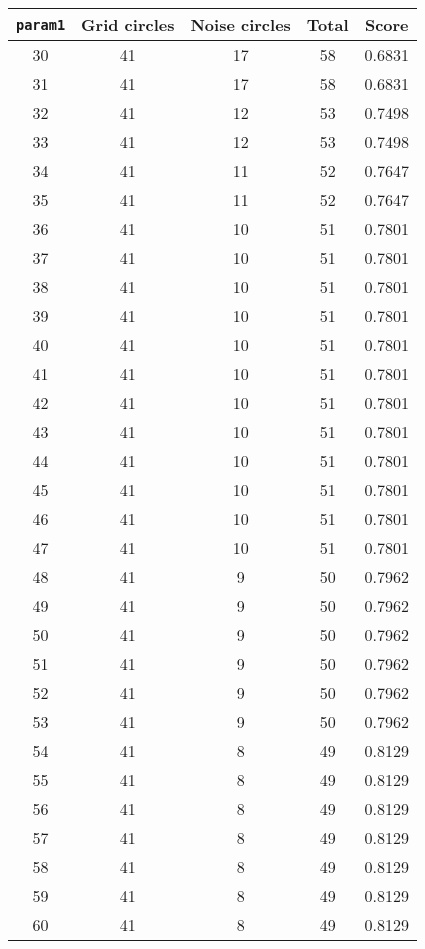 \documentclass[letterpaper, 12pt]{article}
\begin{document}
\begin{longtable}{|c|c|c|c|c|}
\hline
\textbf{\texttt{param1}} & \textbf{Grid circles} & \textbf{Noise circles} & \textbf{Total} & \textbf{Score} \\
\hline
30 & 41 & 17 & 58 & 0.6831 \\
\hline
31 & 41 & 17 & 58 & 0.6831 \\
\hline
32 & 41 & 12 & 53 & 0.7498 \\
\hline
33 & 41 & 12 & 53 & 0.7498 \\
\hline
34 & 41 & 11 & 52 & 0.7647 \\
\hline
35 & 41 & 11 & 52 & 0.7647 \\
\hline
36 & 41 & 10 & 51 & 0.7801 \\
\hline
37 & 41 & 10 & 51 & 0.7801 \\
\hline
38 & 41 & 10 & 51 & 0.7801 \\
\hline
39 & 41 & 10 & 51 & 0.7801 \\
\hline
40 & 41 & 10 & 51 & 0.7801 \\
\hline
41 & 41 & 10 & 51 & 0.7801 \\
\hline
42 & 41 & 10 & 51 & 0.7801 \\
\hline
43 & 41 & 10 & 51 & 0.7801 \\
\hline
44 & 41 & 10 & 51 & 0.7801 \\
\hline
45 & 41 & 10 & 51 & 0.7801 \\
\hline
46 & 41 & 10 & 51 & 0.7801 \\
\hline
47 & 41 & 10 & 51 & 0.7801 \\
\hline
48 & 41 & 9 & 50 & 0.7962 \\
\hline
49 & 41 & 9 & 50 & 0.7962 \\
\hline
50 & 41 & 9 & 50 & 0.7962 \\
\hline
51 & 41 & 9 & 50 & 0.7962 \\
\hline
52 & 41 & 9 & 50 & 0.7962 \\
\hline
53 & 41 & 9 & 50 & 0.7962 \\
\hline
54 & 41 & 8 & 49 & 0.8129 \\
\hline
55 & 41 & 8 & 49 & 0.8129 \\
\hline
56 & 41 & 8 & 49 & 0.8129 \\
\hline
57 & 41 & 8 & 49 & 0.8129 \\
\hline
58 & 41 & 8 & 49 & 0.8129 \\
\hline
59 & 41 & 8 & 49 & 0.8129 \\
\hline
60 & 41 & 8 & 49 & 0.8129 \\

\end{longtable}
\end{document}
